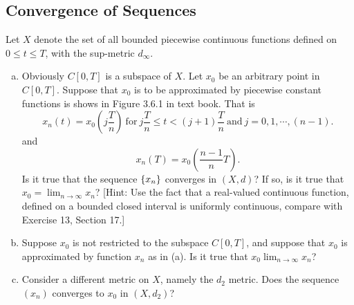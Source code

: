 \subsection{Convergence of Sequences}
\begin{problem}
	Let $ X $ denote the set of all bounded piecewise continuous functions defined on $ 0\leq t\leq T $, with the sup-metric $ d_\infty $.
	\begin{enumerate}[(a)]
		\item Obviously $ C[0,T] $ is a subspace of $ X $. Let $ x_0 $ be an arbitrary point in $ C[0,T] $. Suppose that $ x_0 $ is to be approximated by piecewise constant functions is shows in Figure 3.6.1 in text book. That is
		\[ x_n(t) = x_0(j\frac{T}{n}) \ \text{for}\ j\frac{T}{n} \leq t < (j+1)\frac{T}{n} \ \text{and}\ j=0,1,\cdots,(n-1). \]
		and
		\[ x_n(T) = x_0(\frac{n-1}{n}T). \]
		Is it true that the sequence $ \{x_n\} $ converges in $ (X,d) $? If so, is it true that $ x_0 = \lim_{n\to\infty}x_n $? [Hint: Use the fact that a real-valued continuous function, defined on a bounded closed interval is uniformly continuous, compare with Exercise 13, Section 17.]
		
		\item Suppose $ x_0 $ is not restricted to the subspace $ C[0,T] $, and suppose that $ x_0 $ is approximated by function $ x_n $ as in (a). Is it true that $ x_0 \lim_{n\to\infty}x_n $?
		
		
		\item Consider a different metric on $ X $, namely the $ d_2 $ metric. Does the sequence $ (x_n) $ converges to $ x_0 $ in $ (X,d_2) $?
	\end{enumerate}
\end{problem}
